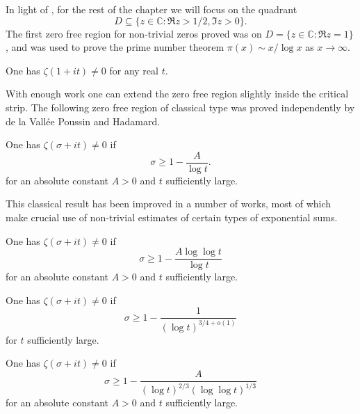 In light of , for the rest of the chapter we will focus on the quadrant 
\[
D\subseteq \{z \in \mathbb{C}: \Re z > 1/2, \Im z > 0\}.
\]
The first zero free region for non-trivial zeros proved was on $D = \{z \in \mathbb{C}: \Re z = 1\}$, and was used to prove the prime number theorem $\pi(x) \sim x/\log x$ as $x \to \infty$.

\begin{theorem}
One has $\zeta(1 + it) \ne 0$ for any real $t$.
\end{theorem}

With enough work one can extend the zero free region slightly inside the critical strip. The following zero free region of classical type was proved independently by de la Vall\'ee Poussin and Hadamard.

\begin{theorem}
One has $\zeta(\sigma + it) \ne 0$ if 
\[
\sigma \ge 1 - \frac{A}{\log t}.
\]
for an absolute constant $A > 0$ and $t$ sufficiently large.
\end{theorem}

This classical result has been improved in a number of works, most of which make crucial use of non-trivial estimates of certain types of exponential sums.

\begin{theorem}
One has $\zeta(\sigma + it) \ne 0$ if 
\[
\sigma \ge 1 - \frac{A \log\log t}{\log t}
\]
for an absolute constant $A > 0$ and $t$ sufficiently large.
\end{theorem}

\begin{theorem}
One has $\zeta(\sigma + it) \ne 0$ if 
\[
\sigma \ge 1 - \frac{1}{(\log t)^{3/4 + o(1)}}
\]
for $t$ sufficiently large.
\end{theorem}

\begin{theorem}
One has $\zeta(\sigma + it) \ne 0$ if 
\[
\sigma \ge 1 - \frac{A}{(\log t)^{2/3}(\log\log t)^{1/3}}
\]
for an absolute constant $A > 0$ and $t$ sufficiently large.
\end{theorem}
